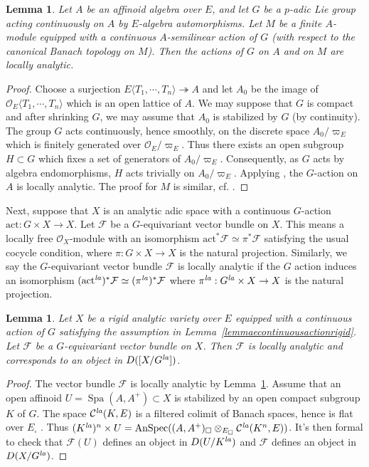 \documentclass[a4paper,10pt]{amsart}
\theoremstyle{remark}
\theoremstyle{definition}
\theoremstyle{plain}
\newtheorem{lemma}[theorem]{Lemma}
\numberwithin{equation}{section}
\newcommand{\calC}{{\mathcal C}}
\newcommand{\calF}{{\mathcal F}}
\newcommand{\calO}{{\mathcal O}}
\newcommand{\la}{{\it la}}
\DeclareMathOperator{\Spa}{Spa}
\DeclareMathOperator{\AnSpec}{AnSpec}
\begin{document}
\begin{lemma}\label{lemmacontla}
	Let $A$ be an affinoid algebra over $E$, and let $G$ be a $p$-adic Lie group acting continuously on $A$ by $E$-algebra automorphisms. Let $M$ be a finite $A$-module equipped with a continuous $A$-semilinear action of $G$ (with respect to the canonical Banach topology on $M$). Then the actions of $G$ on $A$ and on $M$ are locally analytic.
\end{lemma}
\begin{proof}
	Choose a surjection $E\langle T_1,\cdots,T_n\rangle\twoheadrightarrow A$ and let $A_0$ be the image of $\calO_E\langle T_1,\cdots,T_n\rangle$ which is an open lattice of $A$. We may suppose that $G$ is compact and after shrinking $G$, we may assume that $A_0$ is stabilized by $G$ (by continuity). The group $G$ acts continuously, hence smoothly, on the discrete space $A_0/\varpi_E$  which is finitely generated over $\calO_E/\varpi_E$. Thus there exists an open subgroup $H\subset G$ which fixes a set of generators of $A_0/\varpi_E$. Consequently, as  $G$ acts by algebra endomorphisms, $H$ acts trivially on $A_0/\varpi_E$. Applying \cite[Prop.~3.4.1]{JC23}, the $G$-action on $A$ is locally analytic. The proof for $M$ is similar, cf. \cite[Exam.~2.3.8]{camargo2026geometricSen}. 
\end{proof}
Next, suppose that $X$ is an analytic adic space with a continuous $G$-action $\mathrm{act}:G\times X\rightarrow X$. Let $\calF$ be a $G$-equivariant vector bundle on $X$. This means a locally free $\calO_X$-module with an isomorphism $\mathrm{act}^*\calF\simeq \pi^*\calF$ satisfying the usual cocycle condition, where $\pi:G\times X\rightarrow X$ is the natural projection. Similarly, we say the $G$-equivariant vector bundle $\calF$ is locally analytic if the $G$ action induces an isomorphism $(\mathrm{act}^{\la})^{*}\calF\simeq (\pi^{\la})^{*}\calF$ where $\pi^{\la}:G^{\la}\times X\to X$ is the natural projection.
\begin{lemma}\label{lemmaequivariantbundle}
	Let $X$ be a rigid analytic variety over $E$ equipped with a continuous action of $G$ satisfying the assumption in Lemma~\ref{lemmaecontinuousactionrigid}. Let $\calF$ be a $G$-equivariant vector bundle on $X$. Then $\calF$ is locally analytic and corresponds to an object in $D([X/G^{\la}])$.
\end{lemma}
\begin{proof}
	The vector bundle $\calF$ is locally analytic by Lemma~\ref{lemmacontla}. Assume that an open affinoid $U=\Spa(A,A^+)\subset X$ is stabilized by an open compact subgroup $K$ of $G$. The space $\calC^{\la}(K,E)$ is a filtered colimit of Banach spaces, hence is flat over $E_{\square}$ \cite[Cor.~A.65]{bosco2021drinfeldproetale}. Thus $(K^{\la})^{n}\times U=\AnSpec ((A,A^+)_{\square}\otimes_{E_{\square}} \calC^{\la}(K^n,E))$. It's then formal to check that $\calF(U)$ defines an object in $D(U/K^{\la})$ and $\calF$ defines an object in $D(X/G^{\la})$.  
\end{proof}
\end{document}
